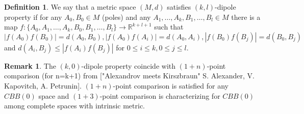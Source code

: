 \documentclass[a4paper,12pt]{article}
\def\ann #1#2#3{ \can({#1}^{#2}_{#3})}
\theoremstyle{definition}
\newtheorem{remark}[theorem]{Remark}
\theoremstyle{definition}
\theoremstyle{definition}
\newtheorem{definition}[theorem]{Definition}
\begin{document}
\def\R{{\mathbb R}}
\def\E{{\mathbb E\,}}
\def\p{{\mathbb P}}
\def\P{{\mathbb P}}
\def\z{{\mathbb Z}}
\def\Z{{\mathbb Z}}
\def\n{{\mathbb N}}

\def\SS{{\mathbb S}}
\def\DD{{\mathcal D}}


\def\N{{\mathbb N}}

\def\c{{\mathbb C}}
\def\C{{\mathbb C}}
\def\wt{\widetilde}
\def \wh{\widehat}

\def\ann #1#2#3{ \can({#1}^{#2}_{#3})} 

\def\ns{{\mathbb N}^*}

\def\ed#1{ {\mathbf 1}_{ \{#1  \}}}             %
\def\e2d#1#2{ {\mathbf 1}_{ \{#1,#2  \}}}             %
\def\AA{{\mathcal A}}
\def\BB{{\mathcal B}}
\def\FF{{\mathcal Q}}
\def\GG{{\mathcal G}}
\def\NN{{\mathcal N}}
\def\PP{{\mathcal P}}
\def\PPP{{\mathscr{P}}}
\def\TT{{\mathcal T}}
\def\w{{\mathcal W}}
\def\M{{\mathcal M}}
\def\Chi{{\mathcal X}}
\def\Tau{{\mathcal T}}
\def\Nu{{\mathcal V}}
\def\qq{{\widetilde{q}}}
\def \EE{{\mathcal{E}}}
\def\<{\langle}
\def\>{\rangle}
\def \ee{{\epsilon}}
\def \dd{{\delta}}
\def \ss{{\sigma}}
\def \aa{{\alpha}}
\def \ll {{\lambda}}
\def \oa {\overrightarrow}

\def \an {\measuredangle}
\def \can {\wt \an}
\def\ann #1#2#3{ \can({#1}^{#2}_{#3})}             %
 
\begin{definition} We say that a metric space $(M, d )$ satisfies
 $(k,l)$-dipole property
if for any 
$A_0, B_0\in M$ (poles) and any
$A_1,\dots, A_k, B_1,\dots, B_l\in M$ there is a map
$f:\{A_0, A_1,\dots, A_k, B_0, B_1,\dots, B_l\}\to \R^{k+l+1}$ such that
$$|f(A_0)f(B_0)|=d(A_0, B_0),|f(A_0)f(A_i)|=d(A_0, A_i), |f(B_0)f(B_j)|=d(B_0, B_j)$$
and
$d(A_i, B_j)\le |f(A_i)f(B_j)|$ for
$0\le i\le k, 0\le j \le l$.
\end{definition}

\begin{remark}
The $(k,0)$-dipole property 
coincide with $(1+n)$-point comparison (for n=k+1)
from
["Alexandrov meets Kirszbraun"
S. Alexander, V. Kapovitch, A. Petrunin].
$(1+n)$-point comparison  is
satisfied for any $CBB(0)$ space
and $(1+3)$-point comparison
is characterizing for $CBB(0)$ among complete spaces
with intrinsic metric.



\end{remark}
\end{document}
